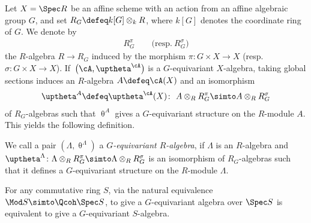 Let $X=\Spec R$ be an affine scheme with an action from an affine algebraic group $G$, and set $R_G\defeq k[G]\otimes_kR$, where $k[G]$ denotes the coordinate ring of $G$. We denote by
\begin{gather*}
R_G^{\pi}\qquad \big(\text{resp.}~R_G^{\sigma}\big)
\end{gather*}
the $R$-algebra $R\to R_G$ induced by the morphism $\pi\colon G\times X\to X$ (resp.\ $\sigma\colon G\times X\to X$).
If~$\big(\cA,\uptheta^{\cA}\big)$ is a $G$-equivariant $X$-algebra, taking global sections induces an $R$-algebra $A\defeq\cA(X)$ and an isomorphism
\begin{gather*}
\uptheta^{A}\defeq\uptheta^{\cA}(X)\colon\ A\otimes_R R_G^{\pi}\simto A\otimes_RR_G^{\sigma}
\end{gather*}
of $R_G$-algebras such that $\uptheta^{A}$ gives a $G$-equivariant structure on the $R$-module $A$. This yields the following definition.


 \begin{dfn}
 We call a pair
 $(\Lambda,\uptheta^{\Lambda})$
 a {\it $G$-equivariant $R$-algebra}, if $\Lambda$ is an $R$-algebra and $\uptheta^{\Lambda}\colon \Lambda\otimes_RR_G^{\pi}\simto\Lambda\otimes_RR_G^{\sigma}$ is an isomorphism of $R_G$-algebras such that it defines a $G$-equivariant structure on the $R$-module $\Lambda$.
 \end{dfn}

 \begin{rem}
For any commutative ring $S$, via the natural equivalence $\Mod S\simto \Qcoh \Spec S$, to give a $G$-equivariant algebra over $\Spec S$ is equivalent to give a $G$-equivariant $S$-algebra.
 \end{rem}

